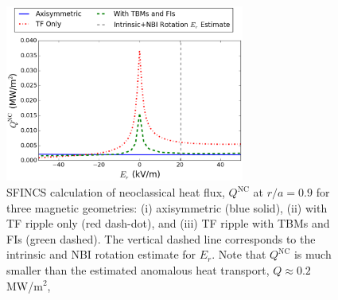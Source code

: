 \documentclass[aip, pop, preprint]{revtex4-1}
\begin{document}
\begin{figure}[h!]
\centering
\includegraphics[width=0.7\textwidth]{figure12.eps}
\caption{\label{fig:HeatFlux} SFINCS calculation of neoclassical heat flux, $Q^{\mathrm{NC}}$ at $r/a = 0.9$ for three magnetic geometries: (i) axisymmetric (blue solid), (ii) with TF ripple only (red dash-dot), and (iii) TF ripple with TBMs and FIs (green dashed). The vertical dashed line corresponds to the intrinsic and NBI rotation estimate for $E_r$. Note that $Q^{\mathrm{NC}}$ is much smaller than the estimated anomalous heat transport, $Q\approx 0.2$ MW/m$^2$,}
\end{figure}

\FloatBarrier
\end{document}
